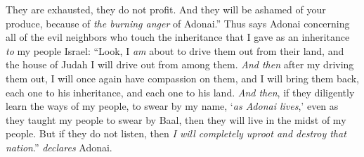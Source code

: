 \begin{biblechapter}
They are exhausted, they do not profit. 
And they will be ashamed of your produce, 
because of \textit{the burning anger} of Adonai.”
\verse Thus says Adonai concerning all of the evil neighbors who touch the inheritance that I gave as an inheritance \textit{to} my people Israel: “Look, I \textit{am} about to drive them out from their land, and the house of Judah I will drive out from among them.
\verse \textit{And then} after my driving them out, I will once again have compassion on them, and I will bring them back, each one to his inheritance, and each one to his land.
\verse \textit{And then}, if they diligently learn the ways of my people, to swear by my name, ‘\textit{as Adonai lives},’ even as they taught my people to swear by Baal, then they will live in the midst of my people.
\verse But if they do not listen, then \textit{I will completely uproot and destroy that nation}.” \textit{declares} Adonai.
\end{biblechapter}

